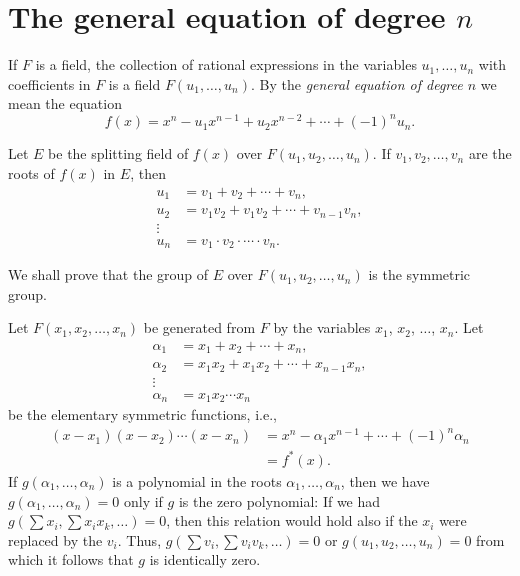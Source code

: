 \documentclass[10pt,leqno,a5paper]{book}
\theoremstyle{definition}
\let\htw\section
\begin{document}
\htw[The general equation of degree n]{The general equation of degree $n$}

If $F$ is a field, the collection of rational expressions in the variables $u_1, \ldots, u_n$ with coefficients in $F$ is a field $F(u_1, \ldots, u_n)$.
By the \emph{general equation of degree $n$} we mean the equation
\begin{equation}
\label{eq:III.1}
f(x) = x^n - u_1 x^{n-1} + u_2 x^{n-2} + \cdots + (-1)^n u_n.
\end{equation}

Let $E$ be the splitting field of $f(x)$ over $F(u_1, u_2, \ldots, u_n)$.
If $v_1, v_2, \ldots, v_n$ are the roots of $f(x)$ in $E$, then
\begin{align*}
u_1 &= v_1 + v_2 + \cdots + v_n,
\\
u_2 &= v_1 v_2 + v_1 v_2 + \cdots + v_{n-1} v_n,
\\
\vdots &
\\
u_n &= v_1 \cdot v_2 \cdot \cdots \cdot v_n.
\end{align*}

We shall prove that the group of $E$ over $F(u_1, u_2, \ldots, u_n)$ is the symmetric group.

Let $F(x_1, x_2, \ldots, x_n)$ be generated from $F$ by the variables $x_1$, $x_2$, $\ldots$, $x_n$.
Let
\begin{align*}
\alpha_1 &= x_1 + x_2 + \cdots + x_n,
\\
\alpha_2 &= x_1 x_2 + x_1 x_2 + \cdots + x_{n-1} x_n,
\\
\vdots &
\\
\alpha_n &= x_1 x_2 \cdots x_n
\end{align*}
be the elementary symmetric functions, i.e.,
\begin{align*}
(x - x_1) (x - x_2) \cdots (x - x_n)
&= x^n - \alpha_1 x^{n-1} + \cdots + (-1)^n \alpha_n
\\
&= f^*(x).
\end{align*}
If $g(\alpha_1, \ldots, \alpha_n)$ is a polynomial in the roots $\alpha_1, \ldots, \alpha_n$, then we have $g(\alpha_1, \ldots, \alpha_n) = 0$ only if $g$ is the zero polynomial:
If we had $g(\sum x_i, \sum x_i x_k, \ldots ) = 0$, then this relation would hold also if the $x_i$ were replaced by the $v_i$.
Thus, $g(\sum v_i, \sum v_i v_k, \ldots) = 0$ or $g(u_1, u_2, \ldots, u_n) = 0$ from which it follows that $g$ is identically zero.
\end{document}

